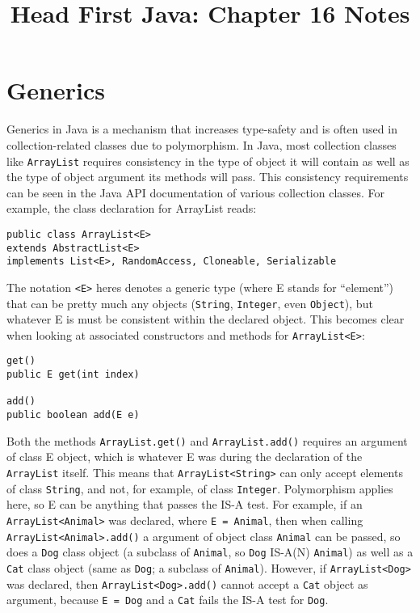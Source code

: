 \documentclass{tufte-handout}
\title{Head First Java: Chapter 16 Notes}
\begin{document}
    \maketitle

    \section*{Generics}
    Generics in Java is a mechanism that increases type-safety and is often used in collection-related classes due to polymorphism. In Java, most collection classes like \texttt{ArrayList} requires consistency in the type of object it will contain as well as the type of object argument its methods will pass. This consistency requirements can be seen in the Java API documentation of various collection classes. For example, the class declaration for ArrayList reads:

    \begin{lstlisting}
public class ArrayList<E>
extends AbstractList<E>
implements List<E>, RandomAccess, Cloneable, Serializable
    \end{lstlisting}

    The notation \texttt{<E>} heres denotes a generic type (where E stands for ``element'') that can be pretty much any objects (\texttt{String}, \texttt{Integer}, even \texttt{Object}), but whatever E is must be consistent within the declared object. This becomes clear when looking at associated constructors and methods for \texttt{ArrayList<E>}:

    \begin{lstlisting}
get()
public E get(int index)

add()
public boolean add(E e)
    \end{lstlisting}

    Both the methods \texttt{ArrayList.get()} and \texttt{ArrayList.add()} requires an argument of class E object, which is whatever E was during the declaration of the \texttt{ArrayList} itself. This means that \texttt{ArrayList<String>} can only accept elements of class \texttt{String}, and not, for example, of class \texttt{Integer}. Polymorphism applies here, so E can be anything that passes the IS-A test. For example, if an \texttt{ArrayList<Animal>} was declared, where \texttt{E = Animal}, then when calling \texttt{ArrayList<Animal>.add()} a argument of object class \texttt{Animal} can be passed, so does a \texttt{Dog} class object (a subclass of \texttt{Animal}, so \texttt{Dog} IS-A(N) \texttt{Animal}) as well as a \texttt{Cat} class object (same as \texttt{Dog}; a subclass of \texttt{Animal}). However, if \texttt{ArrayList<Dog>} was declared, then \texttt{ArrayList<Dog>.add()} cannot accept a \texttt{Cat} object as argument, because \texttt{E = Dog} and a \texttt{Cat} fails the IS-A test for \texttt{Dog}.
\end{document}

